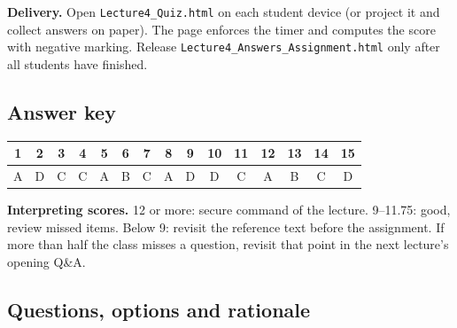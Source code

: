 \documentclass[11pt]{article}
\begin{document}
\textbf{Delivery.} Open \texttt{Lecture4\_Quiz.html} on each student device (or project it and collect answers on paper). The page enforces the timer and computes the score with negative marking. Release \texttt{Lecture4\_Answers\_Assignment.html} only after all students have finished.

\subsection*{Answer key}\begin{center}\small\renewcommand{\arraystretch}{1.3}\begin{tabular}{|c|c|c|c|c|c|c|c|c|c|c|c|c|c|c|}\hline \textbf{1} & \textbf{2} & \textbf{3} & \textbf{4} & \textbf{5} & \textbf{6} & \textbf{7} & \textbf{8} & \textbf{9} & \textbf{10} & \textbf{11} & \textbf{12} & \textbf{13} & \textbf{14} & \textbf{15}\\\hline A & D & C & C & A & B & C & A & D & D & C & A & B & C & D\\\hline\end{tabular}\end{center}

\textbf{Interpreting scores.} 12 or more: secure command of the lecture. 9--11.75: good, review missed items. Below 9: revisit the reference text before the assignment. If more than half the class misses a question, revisit that point in the next lecture's opening Q\&A.

\subsection*{Questions, options and rationale}
\end{document}
